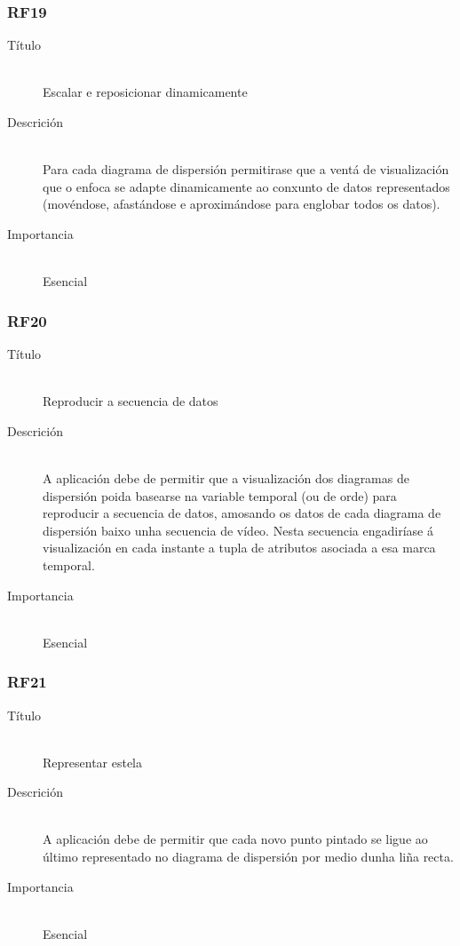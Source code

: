 \subsubsection*{RF19}
\begin{description}
\item[Título] \hfill \\
Escalar e reposicionar dinamicamente
\item[Descrición] \hfill \\
Para cada diagrama de dispersión permitirase que a ventá de visualización que o enfoca se adapte dinamicamente ao conxunto de datos representados (movéndose, afastándose e aproximándose para englobar todos os datos).
\item[Importancia] \hfill \\
Esencial
\end{description}

\subsubsection*{RF20}
\begin{description}
\item[Título] \hfill \\
Reproducir a secuencia de datos
\item[Descrición] \hfill \\
A aplicación debe de permitir que a visualización dos diagramas de dispersión poida basearse na variable temporal (ou de orde) para reproducir a secuencia de datos, amosando os datos de cada diagrama de dispersión baixo unha secuencia de vídeo. Nesta secuencia engadiríase á visualización en cada instante a tupla de atributos asociada a esa marca temporal. 
\item[Importancia] \hfill \\
Esencial
\end{description}

\subsubsection*{RF21}
\begin{description}
\item[Título] \hfill \\
Representar estela
\item[Descrición] \hfill \\
A aplicación debe de permitir que cada novo punto pintado se ligue ao último representado no diagrama de dispersión por medio dunha liña recta.
\item[Importancia] \hfill \\
Esencial
\end{description}

